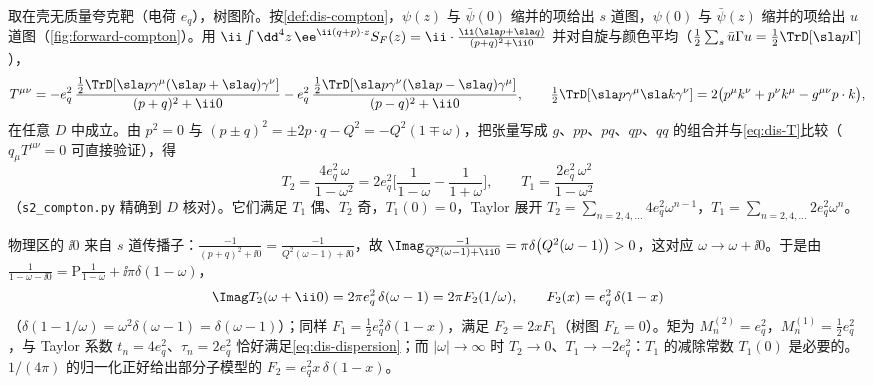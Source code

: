 \begin{example}[自由夸克的前向振幅]\label{ex:dis-free-quark}
取在壳无质量夸克靶（电荷 $e_q$），树图阶。按\cref{def:dis-compton}，$\psi(z)$ 与 $\bar\psi(0)$ 缩并的项给出 $s$ 道图，$\psi(0)$ 与 $\bar\psi(z)$ 缩并的项给出 $u$ 道图（\cref{fig:forward-compton}）。用 $\ii\int\dd^4z\,\ee^{\ii(q+p)\cdot z}S_F(z)=\ii\cdot\frac{\ii(\sla p+\sla q)}{(p+q)^2+\ii0}$ 并对自旋与颜色平均（$\frac12\sum_s\bar u\Gamma u=\frac12\TrD[\sla p\Gamma]$），
\[
T^{\mu\nu}=-e_q^2\,\frac{\frac12\TrD[\sla p\gamma^\mu(\sla p+\sla q)\gamma^\nu]}{(p+q)^2+\ii0}-e_q^2\,\frac{\frac12\TrD[\sla p\gamma^\nu(\sla p-\sla q)\gamma^\mu]}{(p-q)^2+\ii0},
\qquad \tfrac12\TrD[\sla p\gamma^\mu\sla k\gamma^\nu]=2\big(p^\mu k^\nu+p^\nu k^\mu-g^{\mu\nu}p\cdot k\big),
\]
在任意 $D$ 中成立。由 $p^2=0$ 与 $(p\pm q)^2=\pm2p\cdot q-Q^2=-Q^2(1\mp\omega)$，把张量写成 $g$、$pp$、$pq$、$qp$、$qq$ 的组合并与\cref{eq:dis-T}比较（$q_\mu T^{\mu\nu}=0$ 可直接验证），得
\begin{equation}\label{eq:dis-free-T}
T_2=\frac{4e_q^2\,\omega}{1-\omega^2}=2e_q^2\Big[\frac1{1-\omega}-\frac1{1+\omega}\Big],\qquad T_1=\frac{2e_q^2\,\omega^2}{1-\omega^2}
\end{equation}
（\texttt{s2\_compton.py} 精确到 $D$ 核对）。它们满足 $T_1$ 偶、$T_2$ 奇，$T_1(0)=0$，Taylor 展开 $T_2=\sum_{n=2,4,\dots}4e_q^2\omega^{n-1}$，$T_1=\sum_{n=2,4,\dots}2e_q^2\omega^n$。

物理区的 $\ii0$ 来自 $s$ 道传播子：$\frac{-1}{(p+q)^2+\ii0}=\frac{-1}{Q^2(\omega-1)+\ii0}$，故 $\Imag\frac{-1}{Q^2(\omega-1)+\ii0}=\pi\delta\big(Q^2(\omega-1)\big)>0$，这对应 $\omega\to\omega+\ii0$。于是由 $\frac1{1-\omega-\ii0}=\mathrm P\frac1{1-\omega}+\ii\pi\delta(1-\omega)$，
\[
\Imag T_2(\omega+\ii0)=2\pi e_q^2\,\delta(\omega-1)=2\pi F_2(1/\omega),\qquad F_2(x)=e_q^2\,\delta(1-x)
\]
（$\delta(1-1/\omega)=\omega^2\delta(\omega-1)=\delta(\omega-1)$）；同样 $F_1=\frac12e_q^2\delta(1-x)$，满足 $F_2=2xF_1$（树图 $F_L=0$）。矩为 $M^{(2)}_n=e_q^2$，$M^{(1)}_n=\frac12e_q^2$，与 Taylor 系数 $t_n=4e_q^2$、$\tau_n=2e_q^2$ 恰好满足\cref{eq:dis-dispersion}；而 $|\omega|\to\infty$ 时 $T_2\to0$、$T_1\to-2e_q^2$：$T_1$ 的减除常数 $T_1(0)$ 是必要的。$1/(4\pi)$ 的归一化正好给出部分子模型的 $F_2=e_q^2x\,\delta(1-x)$。
\end{example}
